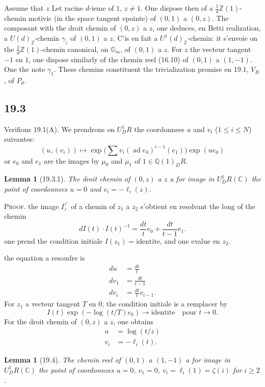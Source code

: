 \documentclass[12pt,a4paper]{article}
\theoremstyle{plain}
\newtheorem{lemma}[theorem]{Lemma}
\theoremstyle{definition}
\theoremstyle{remark}
\DeclareMathOperator{\ad}{ad}
\newcommand{\Betti}{B}
\newcommand{\dR}{DR}
\newcommand{\Gm}{\mathbb{G}_m}
\newcommand{\ZZ}{\mathbb{Z}}
\newcommand{\QQ}{\mathbb{Q}}
\newcommand{\CC}{\mathbb{C}}
\begin{document}
Assume that $z$ Let racine $d$-ieme of $1$, $z \neq 1$. One
dispose then of a $\frac{1}{d}\ZZ(1)$-chemin motivic (in the space
tangent epointe) of $(0,1)$ a $(0,z)$. The composant with the droit
chemin of $(0,z)$ a $z$, one deduces, en Betti realization, a
$U(d)_\ZZ$-chemin $\gamma_z$ of $(0,1)$ a $z$. C'is en fait a
$U^1(d)_\ZZ$-chemin: it s'envoie on the $\frac{1}{d}\ZZ(1)$-chemin
canonical, on $\Gm$, of $(0,1)$ a $z$. For $z$ the vecteur tangent
$-1$ en $1$, one dispose similarly of the chemin reel (16.10) of $(0,1)$ a
$(1,-1)$. One the note $\gamma_1$. These chemins constituent the
trivialization promise en 19.1, $V_\Betti$, of $P_d$.

\subsection{19.3}

Verifions 19.1(A). We prendrons on $U^1_\dR$ the coordonnees $u$
and $v_i$ ($1 \leq i \leq N$) suivantes:
\[
(u, (v_i)) \longmapsto \exp\bigl(\sum v_i (\ad e_0)^{i-1}(e_1)\bigr) \exp(u e_0)
\]
or $e_0$ and $e_1$ are the images by $\mu_0$ and $\mu_1$ of $1 \in
\QQ(1)_\dR$.

\begin{lemma}[19.3.1]\label{lem:19.3.1}
The droit chemin of $(0,z)$ a $z$ a for image in $U^1_\dR(\CC)$ the
point of coordonnees $u = 0$ and $v_i = -\ell_i(z)$.
\end{lemma}

\noindent \textsc{Proof.} the image $I_z^{z'}$ of a chemin of $z_1$ a
$z_2$ s'obtient en resolvant the long of the chemin
\[
dI(t) \cdot I(t)^{-1} = \frac{dt}{t} e_0 + \frac{dt}{t-1} e_1.
\]
one prend the condition initiale $I(z_1) = \text{identite}$, and one
evalue en $z_2$.

the equation a resoudre is
\begin{align*}
du &= \frac{dt}{t} \\
dv_1 &= \frac{dt}{t-1} \\
dv_i &= \frac{dt}{t} v_{i-1}.
\end{align*}
For $z_1$ a vecteur tangent $T$ en $0$, the condition initiale is a
remplacer by
\[
I(t) \exp(-\log(t/T)e_0) \to \text{identite} \quad \text{pour } t \to 0.
\]
For the droit chemin of $(0,z)$ a $z$, one obtains
\begin{align*}
u &= \log(t/z) \\
v_i &= -\ell_i(t).
\end{align*}

\begin{lemma}[19.4]\label{lem:19.4}
The chemin reel of $(0,1)$ a $(1,-1)$ a for image in
$U^1_\dR(\CC)$ the point of coordonnees $u = 0$, $v_1 = 0$,
$v_i = \ell_i(1) = \zeta(i)$ for $i \geq 2$.
\end{lemma}
\end{document}
